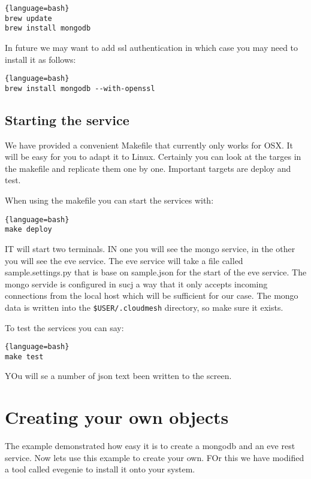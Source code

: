 \begin{lstlisting}{language=bash}
brew update
brew install mongodb
\end{lstlisting}

In future we may want to add ssl authentication in which case you
may
need to install it as follows:

\begin{lstlisting}{language=bash}
brew install mongodb --with-openssl
\end{lstlisting}

\subsection{Starting the service}\label{starting-the-service}

We have provided a convenient Makefile that currently only works for
OSX. It will be easy for you to adapt it to Linux. Certainly you can
look at the targes in the makefile and replicate them one by one.
Important targets are deploy and test.

When using the makefile you can start the services with:

\begin{lstlisting}{language=bash}
make deploy
\end{lstlisting}

IT will start two terminals. IN one you will see the mongo service, in
the other you will see the eve service. The eve service will take a file
called sample.settings.py that is base on sample.json for the start of
the eve service. The mongo servide is configured in sucj a way that it
only accepts incoming connections from the local host which will be
sufficient for our case. The mongo data is written into the
\verb|$USER/.cloudmesh| directory, so make sure it exists.

To test the services you can say:

\begin{lstlisting}{language=bash}
make test
\end{lstlisting}

YOu will se a number of json text been written to the screen.

\section{Creating your own objects}\label{creating-your-own-objects}

The example demonstrated how easy it is to create a mongodb and an eve
rest service. Now lets use this example to create your own. FOr this we
have modified a tool called evegenie to install it onto your system.


